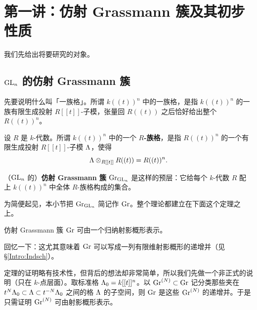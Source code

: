 
\section{第一讲：仿射 Grassmann 簇及其初步性质}\label{Lecture I}

我们先给出将要研究的对象。

\subsection{${\operatorname{GL}}_n$ 的仿射 Grassmann 簇}\label{aff GLn}

先要说明什么叫「一族格」。所谓 $k((t))^n$ 中的一族格，是指 $k((t))^n$ 的一族有限生成投射 $R[[t]]$-子模，张量回 $R((t))$ 之后恰好给出整个 $R((t))^n$。

\begin{dfn}
设 $R$ 是 $k$-代数。所谓 $k((t))^n$ 中的一个 \textbf{$R$-族格}，是指 $R((t))^n$ 的一个有限生成投射 $R[[t]]$-子模 ${\Lambda}$，使得
\[
{\Lambda}\otimes_{R[[t]]}R((t))=R((t))^n .
\]
\end{dfn}

\begin{dfn}
（${\operatorname{GL}}_n$ 的）\textbf{仿射 Grassmann 簇} ${\operatorname{Gr}}_{{\operatorname{GL}}_n}$ 是这样的预层：它给每个 $k$-代数 $R$ 配上 $k((t))^n$ 中全体 $R$-族格构成的集合。
\end{dfn}

为简便起见，本小节把 ${\operatorname{Gr}}_{{\operatorname{GL}}_n}$ 简记作 ${\operatorname{Gr}}$。整个理论都建立在下面这个定理之上。

\begin{thm}\label{rep}
仿射 Grassmann 簇 ${\operatorname{Gr}}$ 可由一个归纳射影概形表示。
\end{thm}

回忆一下：这尤其意味着 ${\operatorname{Gr}}$ 可以写成一列有限维射影概形的递增并（见 \S\ref{Intro:Indsch}）。

定理的证明略有技术性，但背后的想法却非常简单，所以我们先做一个非正式的说明（只在 $k$-点层面）。取标准格 ${\Lambda}_0=k[[t]]^n$。以 ${\operatorname{Gr}}^{(N)}\subset{\operatorname{Gr}}$ 记分类那些夹在 $t^N{\Lambda}_0\subset{\Lambda}\subset t^{-N}{\Lambda}_0$ 之间的格 ${\Lambda}$ 的子空间，则 ${\operatorname{Gr}}$ 是这些 ${\operatorname{Gr}}^{(N)}$ 的递增并。于是只需证明 ${\operatorname{Gr}}^{(N)}$ 可由射影概形表示。

